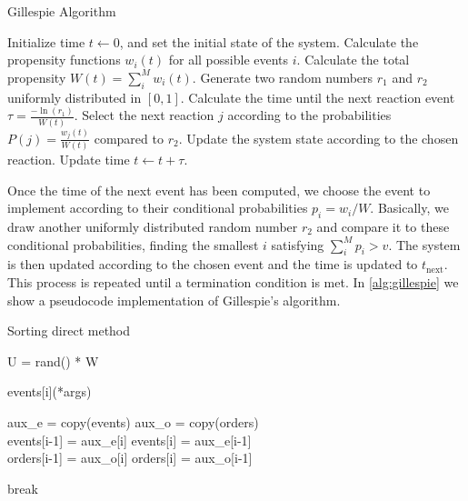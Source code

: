 \begin{algorithm}[H]
  \caption{Gillespie Algorithm}
  \label{alg:gillespie}
  \begin{algorithmic}[1]
    \State Initialize time $t \gets 0$, and set the initial state of the
    system.
    \State Calculate the propensity functions $w_i(t)$ for all possible
    events $i$.
    \State Calculate the total propensity $W(t) = \sum_i^M w_i(t)$.
    \State Generate two random numbers $r_1$ and $r_2$ uniformly
    distributed in $[0,1]$.
    \State Calculate the time until the next reaction event $\tau =
      \frac{-\ln(r_1)}{W(t)}$.
    \State Select the next reaction $j$ according to the probabilities
    $P(j) = \frac{w_j(t)}{W(t)}$ compared to $r_2$.
    \State Update the system state according to the chosen reaction.
    \State Update time $t \gets t + \tau$.
    \EndWhile
  \end{algorithmic}
\end{algorithm}

Once the time of the next event has been computed, we choose the event to
implement according to their conditional probabilities $p_i=w_i/W$.
Basically,
we draw another uniformly distributed random number $r_2$ and compare it to
these conditional probabilities, finding the smallest $i$ satisfying
$\sum_i^Mp_i>v$. The system is then updated according to the chosen event and
the time is updated to $t_{\textrm{next}}$. This process is repeated until a
termination condition is met. In \cref{alg:gillespie} we show a pseudocode
implementation of Gillespie's algorithm.

\begin{algorithm}[H]
  \caption{Sorting direct method}
  \label{alg:Chose_apply_event}
  \begin{algorithmic}[1]

    \State U = rand() * W 

     


    \State events[i](*args) \\

     

    \State aux\_e = copy(events)
    \State aux\_o = copy(orders)\\

    \State events[i-1] = aux\_e[i]
    \State events[i] = aux\_e[i-1]\\

    \State orders[i-1] = aux\_o[i]
    \State orders[i] = aux\_o[i-1]

    \EndIf

    \State break

    \EndIf

    \EndFor

  \end{algorithmic}
\end{algorithm}

